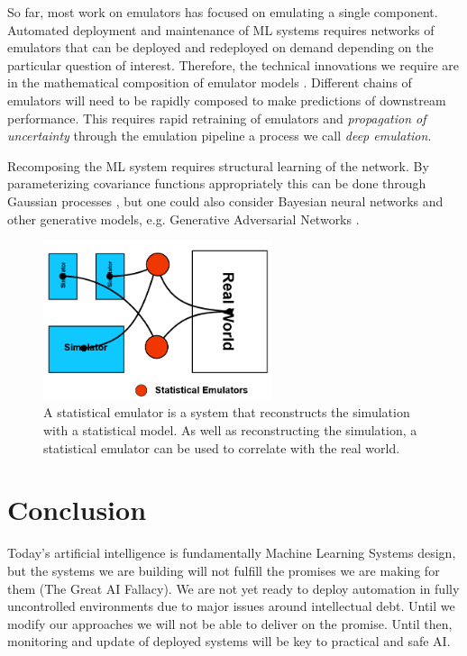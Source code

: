 \documentclass[a4paper]{caesar_book}
\begin{document}
So far, most work on emulators has focused on emulating a single component. Automated deployment and maintenance of ML systems requires networks of emulators that can be deployed and redeployed on demand depending on the particular question of interest. Therefore, the technical innovations we require are in the mathematical composition of emulator models . Different chains of emulators will need to be rapidly composed to make predictions of downstream performance. This requires rapid retraining of emulators and \textit{propagation of uncertainty} through the emulation pipeline a process we call \textit{deep emulation}.

Recomposing the ML system requires structural learning of the network. By parameterizing covariance functions appropriately this can be done through Gaussian processes , but one could also consider Bayesian neural networks and other generative models, e.g. Generative Adversarial Networks .

\begin{figure}%
	\includegraphics[width=0.6\textwidth,keepaspectratio]{pictures/sim_5.PNG}%
	\caption*{A statistical emulator is a system that reconstructs the simulation with a statistical model. As well as reconstructing the simulation, a statistical emulator can be used to correlate with the real world.}%
\end{figure}%

\section{Conclusion}

Today’s artificial intelligence is fundamentally Machine Learning Systems design, but the systems we are building will not fulfill the promises we are making for them (The Great AI Fallacy). We are not yet ready to deploy automation in fully uncontrolled environments due to major issues around intellectual debt. Until we modify our approaches we will not be able to deliver on the promise. Until then, monitoring and update of deployed systems will be key to practical and safe AI.
\end{document}
